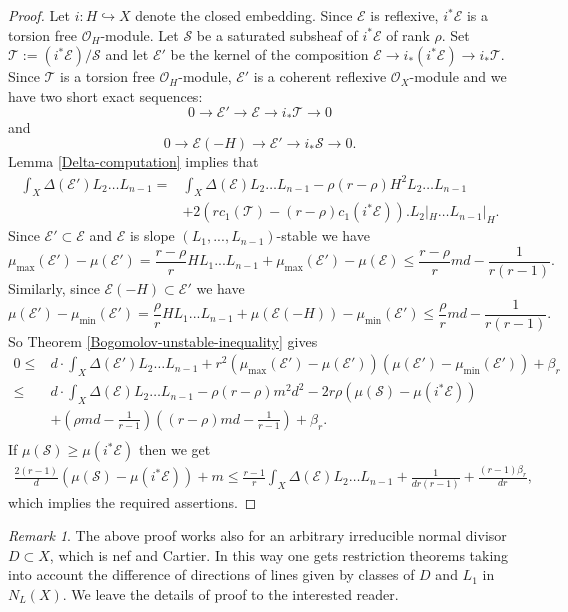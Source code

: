 \documentclass[12pt]{article}
\theoremstyle{plain}
\theoremstyle{definition}
\theoremstyle{remark}
\newtheorem{Remark}[Thm]{Remark}
\newcommand{\cE}{{\mathcal E}}
\newcommand{\cO}{{\mathcal O}}
\newcommand{\cS}{{\mathcal S}}
\newcommand{\cT}{{\mathcal T}}
\begin{document}
\begin{proof}
	Let $i: H\hookrightarrow X$ denote the closed embedding.
	Since $\cE$ is reflexive, $i^*\cE$ is a torsion free $\cO_H$-module.
	Let  $\cS$ be a saturated subsheaf of $i^*\cE$ 
	of rank $\rho$. Set $\cT:=(i^*\cE)/\cS$ and let $\cE '$ be the kernel of the composition
	$\cE\to i_*(i^*\cE)\to i_*\cT$. Since $\cT$ is a torsion free $\cO_H$-module, $\cE '$ is a coherent reflexive $\cO_X$-module and we have two short exact sequences:
	$$0\to \cE '\to \cE \to i_*\cT\to 0$$
	and
	$$0\to \cE(-H)\to \cE ' \to i_* \cS\to 0.$$
	Lemma \ref{Delta-computation} implies that
	\begin{align*}
		\int_X \Delta (\cE ')L_2\dots L_{n-1}
		=&\int_X \Delta (\cE)L_2\dots L_{n-1}-
		\rho  (r-\rho ) H^2L_2\dots L_{n-1}\\
		&+2 (r c_1(\cT)-(r-\rho ) c_1(i^*\cE)). L_2|_H\dots L_{n-1}|_H.
	\end{align*}
	Since $\cE'\subset \cE$ and $\cE$ is slope $(L_1,...,L_{n-1})$-stable
	we have
	$$
	\mu _{\max} (\cE')-\mu (\cE')=\frac{r-\rho}{r}HL_1...L_{n-1}+\mu _{\max} (\cE')-\mu ( \cE)
	\le \frac{r-\rho}{r}md
	-\frac{1}{r(r-1)} .
	$$ Similarly, since $\cE(-H)\subset \cE'$ we have
	$$
	\mu (\cE')-\mu _{\min} (\cE')=\frac{\rho}{r}HL_1...L_{n-1}+\mu (\cE(-H))- \mu _{\min} (\cE')
	\le \frac{\rho}{ r}md-\frac{1}{r(r-1)} .$$ 
	So Theorem \ref{Bogomolov-unstable-inequality} gives
	\begin{align*}
		0\le& 	d\cdot  \int_X \Delta (\cE ')L_2\dots L_{n-1} + r^2(\mu_{\max }(\cE') -\mu  (\cE'))(\mu  (\cE') -\mu_{\min } (\cE') )+\beta_r \\
		\le & 	d\cdot \int_X \Delta (\cE )L_2\dots L_{n-1} -\rho (r-\rho) m^2d^2- 2r\rho (\mu (\cS)-\mu(i^*\cE))\\ 
		&+
		\left(\rho md -\frac{1}{r-1}\right)
		\left ((r-\rho)md -\frac{1}{r-1}\right) +\beta_r.\\
	\end{align*}
	If $\mu (\cS)\ge \mu( i^*\cE)$ then we get
	\begin{align*}
		\frac{2(r-1)}{d} (\mu (\cS)-\mu(i^*\cE))+m\le 	\frac{ r-1}{r} \int_X \Delta (\cE )L_2\dots L_{n-1}+\frac{1}{dr(r-1)}+\frac{(r-1)\beta_r}{dr},
	\end{align*}
	which implies the required assertions.	
\end{proof}

\begin{Remark}
	The above proof works also for an arbitrary irreducible normal divisor $D\subset X$, which is nef and Cartier.  In this way one gets restriction theorems taking into account
the difference of directions of lines given by classes of $D$ and $L_1$ in $N_L(X)$. We leave the details of proof to the interested reader.
\end{Remark}
\end{document}
